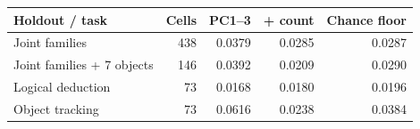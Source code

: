 \begin{tabular}{lrrrr}
\toprule
Holdout / task & Cells & PC1--3 & + count & Chance floor\\
\midrule
Joint families & 438 & 0.0379 & 0.0285 & 0.0287\\
Joint families + 7 objects & 146 & 0.0392 & 0.0209 & 0.0290\\
\quad Logical deduction & 73 & 0.0168 & 0.0180 & 0.0196\\
\quad Object tracking & 73 & 0.0616 & 0.0238 & 0.0384\\
\bottomrule
\end{tabular}
